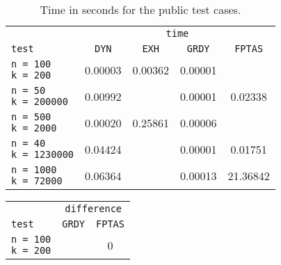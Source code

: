 \documentclass[11pt]{article}
\begin{document}
\begin{figure}[!hbpt]
    \begin{minipage}{0.64\textwidth}
        \begin{table}[H]
            \centering
            \begin{tabular}{|l|c|c|c|c|} \hline
                \cellcolor{blue!20} & \multicolumn{4}{c|}{\cellcolor{blue!20}\texttt{time}} \\ \cline{2-5}
                \cellcolor{blue!20} \texttt{test} & \texttt{DYN} & \texttt{EXH} & \texttt{GRDY} & \texttt{FPTAS} \\ \hline
                \makecell[l]{ \texttt{n = 100} \\ \texttt{k = 200}} & 0.00003 & 0.00362 & 0.00001 & \cellcolor{red!20}{0.00895} \\ \hline
                \makecell[l]{ \texttt{n = 50} \\ \texttt{k = 200000}} & 0.00992 & \cellcolor{red!20}{1.14751} & 0.00001 & 0.02338 \\ \hline
                \makecell[l]{ \texttt{n = 500} \\ \texttt{k = 2000}} & 0.00020 & 0.25861 & 0.00006 & \cellcolor{red!20}{0.60971} \\ \hline
                \makecell[l]{ \texttt{n = 40} \\ \texttt{k = 1230000}} & 0.04424 & \cellcolor{red!20}{7.79745} & 0.00001 & 0.01751 \\ \hline
                \makecell[l]{ \texttt{n = 1000} \\ \texttt{k = 72000}} & 0.06364 & \cellcolor{red!20}{25.26750} & 0.00013 & 21.36842 \\ \hline
            \end{tabular}
            \caption{Time in seconds for the public test cases.}
        \end{table}
    \end{minipage}
    \begin{minipage}{0.35\textwidth}
        \begin{table}[H]
            \centering
            \begin{tabular}{|l|c|c|} \hline
                \cellcolor{blue!20} & \multicolumn{2}{c|}{\cellcolor{blue!20}\texttt{difference}} \\ \cline{2-3}
                \cellcolor{blue!20} \texttt{test} & \texttt{GRDY} & \texttt{FPTAS} \\ \hline
                \makecell[l]{ \texttt{n = 100} \\ \texttt{k = 200}}  & \cellcolor{red!20}{4} & 0 \\ \hline

\end{tabular}
\end{table}
\end{minipage}
\end{figure}
\end{document}
